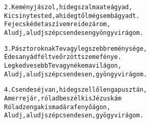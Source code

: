 \newpage
{}
\kottastart
{}
\kottaend
\begin{minipage}{\textwidth}
\begin{alltt}
2. Kemény jászol, hideg szalma a te ágyad,
   Kicsiny tested, a hidegtől mégsem bágyadt.
   Fejecskédet a szívemre ide zárom,
   Aludj, aludj szép csendesen gyöngyvirágom.
\end{alltt}
\vspace{0.0cm}
\versszakspacing
\end{minipage}
\begin{minipage}{\textwidth}
\begin{alltt}
3. Pásztoroknak Te vagy legszebb reménysége,
   Édesanyád féltve őrzött szeme fénye.
   Legkedvesebb Te vagy nékem a világon,
   Aludj, aludj szép csendesen, gyöngyvirágom.
\end{alltt}
\vspace{0.0cm}
\versszakspacing
\end{minipage}
\begin{minipage}{\textwidth}
\begin{alltt}
4. Csendes éj van, hideg szellő leng a pusztán,
   Amerre jár, rólad beszél kis Jézuskám
   Rólad zeng a kis madár a fenyőágon,
   Aludj, aludj szép csendesen, gyögyvirágom.
\end{alltt}
\vspace{0.0cm}
\versszakspacing
\end{minipage}
